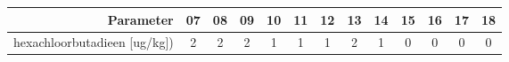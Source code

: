 \begin{tabular}{ r |c | c | c | c | c |c | c | c | c | c | c | c } 
\rowcolor[HTML]{EFEFEF}  
 Parameter & 07 & 08 & 09 & 10 & 11 & 12 & 13 & 14 & 15 & 16 & 17 & 18 \\    \hline     
hexachloorbutadieen [ug/kg]) &2 & 2 & 2 & 1 & 1 & 1 & 2 & 1 & 0 & 0 & 0 & 0 \\
\end{tabular}    
